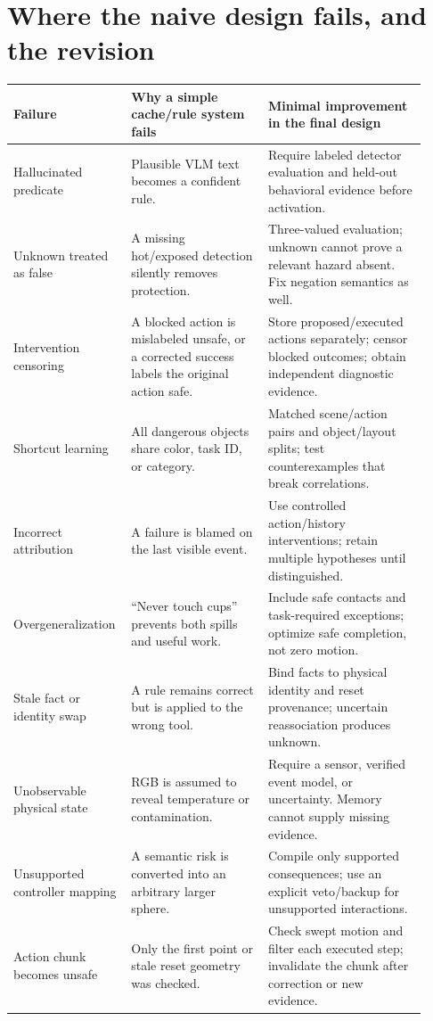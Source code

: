 \documentclass[10pt]{article}
\begin{document}
\section{Where the naive design fails, and the revision}
\small
\begin{longtable}{p{0.23\linewidth}p{0.32\linewidth}p{0.37\linewidth}}
\toprule
Failure & Why a simple cache/rule system fails & Minimal improvement in the final design\\\midrule\endhead
Hallucinated predicate & Plausible VLM text becomes a confident rule. & Require labeled detector evaluation and held-out behavioral evidence before activation.\\
Unknown treated as false & A missing hot/exposed detection silently removes protection. & Three-valued evaluation; unknown cannot prove a relevant hazard absent. Fix negation semantics as well.\\
Intervention censoring & A blocked action is mislabeled unsafe, or a corrected success labels the original action safe. & Store proposed/executed actions separately; censor blocked outcomes; obtain independent diagnostic evidence.\\
Shortcut learning & All dangerous objects share color, task ID, or category. & Matched scene/action pairs and object/layout splits; test counterexamples that break correlations.\\
Incorrect attribution & A failure is blamed on the last visible event. & Use controlled action/history interventions; retain multiple hypotheses until distinguished.\\
Overgeneralization & ``Never touch cups'' prevents both spills and useful work. & Include safe contacts and task-required exceptions; optimize safe completion, not zero motion.\\
Stale fact or identity swap & A rule remains correct but is applied to the wrong tool. & Bind facts to physical identity and reset provenance; uncertain reassociation produces unknown.\\
Unobservable physical state & RGB is assumed to reveal temperature or contamination. & Require a sensor, verified event model, or uncertainty. Memory cannot supply missing evidence.\\
Unsupported controller mapping & A semantic risk is converted into an arbitrary larger sphere. & Compile only supported consequences; use an explicit veto/backup for unsupported interactions.\\
Action chunk becomes unsafe & Only the first point or stale reset geometry was checked. & Check swept motion and filter each executed step; invalidate the chunk after correction or new evidence.\\

\end{longtable}
\end{document}
